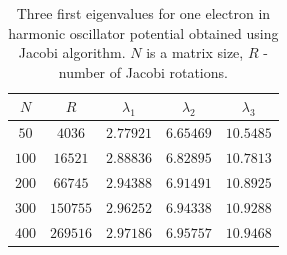\documentclass[10pt]{article}
\begin{document}
\begin{table}[h!]
  \caption{Three first eigenvalues for one electron in harmonic oscillator potential obtained using Jacobi algorithm. $N$ is a matrix size, $R$ - number of Jacobi rotations.}
  \label{tab:one}
  \begin{center}
    \begin{tabular}{c|c|c|c|c}
    \hline
		$N$ & $R$ & $\lambda_1$ & $\lambda_2$ & $\lambda_3$ \\
        \hline
	$	50 $  & $ 4036  $ & $2.77921$ & $6.65469$ & $10.5485$ \\
	$	100$  & $ 16521 $ & $2.88836$ & $6.82895$ & $10.7813$ \\
	$	200$  & $ 66745 $ & $2.94388$ & $6.91491$ & $10.8925$ \\
	$	300$  & $ 150755$ & $2.96252$ & $6.94338$ & $10.9288$ \\
	$	400$  & $ 269516$ & $2.97186$ & $6.95757$ & $10.9468$ \\

	\end{tabular}
  \end{center}
\end{table}
\end{document}
